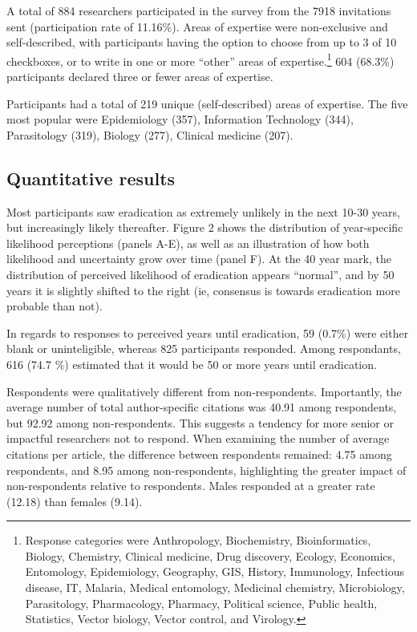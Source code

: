 \documentclass[]{article}
\let\rmarkdownfootnote\footnote%
\def\footnote{\protect\rmarkdownfootnote}
\begin{document}
A total of 884 researchers participated in the survey from the 7918
invitations sent (participation rate of 11.16\%). Areas of expertise
were non-exclusive and self-described, with participants having the
option to choose from up to 3 of 10 checkboxes, or to write in one or
more ``other'' areas of
expertise.\footnote{Response categories were Anthropology, Biochemistry, Bioinformatics, Biology, Chemistry, Clinical medicine, Drug discovery, Ecology, Economics, Entomology, Epidemiology, Geography, GIS, History, Immunology, Infectious disease, IT, Malaria, Medical entomology, Medicinal chemistry, Microbiology, Parasitology, Pharmacology, Pharmacy, Political science, Public health, Statistics, Vector biology, Vector control, and Virology.}
604 (68.3\%) participants declared three or fewer areas of expertise.

Participants had a total of 219 unique (self-described) areas of
expertise. The five most popular were Epidemiology (357), Information
Technology (344), Parasitology (319), Biology (277), Clinical medicine
(207).

\subsection*{Quantitative results}

Most participants saw eradication as extremely unlikely in the next
10-30 years, but increasingly likely thereafter. Figure 2 shows the
distribution of year-specific likelihood perceptions (panels A-E), as
well as an illustration of how both likelihood and uncertainty grow over
time (panel F). At the 40 year mark, the distribution of perceived
likelihood of eradication appears ``normal'', and by 50 years it is
slightly shifted to the right (ie, consensus is towards eradication more
probable than not).

In regards to responses to perceived years until eradication, 59 (0.7\%)
were either blank or uninteligible, whereas 825 participants responded.
Among respondants, 616 (74.7 \%) estimated that it would be 50 or more
years until eradication.

Respondents were qualitatively different from non-respondents.
Importantly, the average number of total author-specific citations was
40.91 among respondents, but 92.92 among non-respondents. This suggests
a tendency for more senior or impactful researchers not to respond. When
examining the number of average citations per article, the difference
between respondents remained: 4.75 among respondents, and 8.95 among
non-respondents, highlighting the greater impact of non-respondents
relative to respondents. Males responded at a greater rate (12.18) than
females (9.14).
\end{document}
